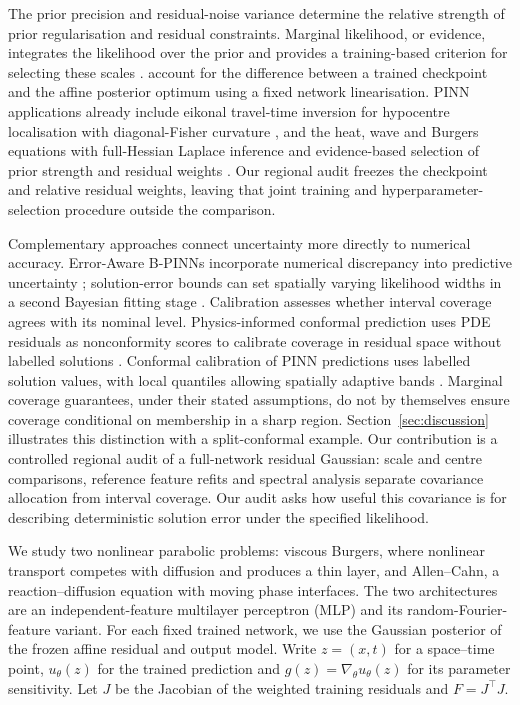 The prior precision and residual-noise variance determine the relative strength
of prior regularisation and residual constraints. Marginal likelihood, or
evidence, integrates the likelihood over the prior and provides a training-based
criterion for selecting these scales \citep{immer2021evidence}.
\citet{antoran2022evidence} account for the difference between a trained
checkpoint and the affine posterior optimum using a fixed network linearisation.
PINN applications already include eikonal travel-time inversion for hypocentre
localisation with diagonal-Fisher curvature \citep{izzatullah2022hypopinn}, and
the heat, wave and Burgers equations with full-Hessian Laplace inference and
evidence-based selection of prior strength and residual weights
\citep{graczyk2026bayesian}. Our regional audit freezes the checkpoint and
relative residual weights, leaving that joint training and hyperparameter-selection
procedure outside the comparison.

Complementary approaches connect uncertainty more directly to numerical accuracy.
Error-Aware B-PINNs incorporate numerical discrepancy into predictive uncertainty
\citep{graf2022erroraware}; solution-error bounds can set spatially varying
likelihood widths in a second Bayesian fitting stage \citep{flores2025errorbounds}.
Calibration assesses whether interval coverage agrees with its nominal level.
Physics-informed conformal prediction uses PDE residuals as nonconformity scores
to calibrate coverage in residual space
without labelled solutions \citep{gopakumar2025calibrated}. Conformal calibration
of PINN predictions uses labelled solution values, with local quantiles allowing
spatially adaptive bands \citep{yu2026conformal}. Marginal coverage guarantees,
under their stated assumptions, do not by themselves ensure coverage conditional
on membership in a sharp region. Section~\ref{sec:discussion} illustrates this
distinction with a split-conformal example. Our contribution is a controlled
regional audit of a full-network residual Gaussian: scale and centre comparisons,
reference feature refits and spectral analysis separate covariance allocation
from interval coverage. Our audit asks how useful this covariance is for describing
deterministic solution error under the specified likelihood.

We study two nonlinear parabolic problems: viscous Burgers, where nonlinear
transport competes with diffusion and produces a thin layer, and Allen--Cahn,
a reaction--diffusion equation with moving phase interfaces. The two architectures
are an independent-feature multilayer perceptron (MLP) and its random-Fourier-feature
variant. For each fixed trained network, we use the Gaussian posterior of the
frozen affine residual and output model. Write $z=(x,t)$ for a space--time point,
$u_\theta(z)$ for the trained prediction and $g(z)=\nabla_\theta u_\theta(z)$ for
its parameter sensitivity. Let $J$ be the Jacobian of the weighted training
residuals and $F=J^\top J$.

